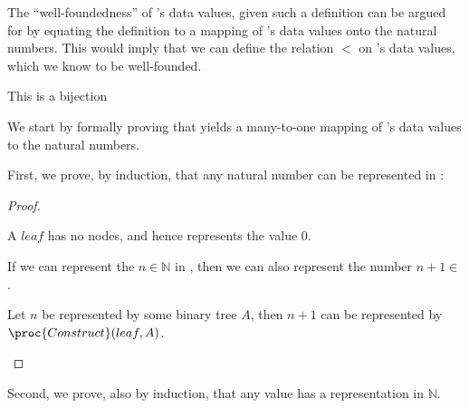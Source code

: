 The ``well-foundedness'' of 's data values, given such a definition can
be argued for by equating the definition to a mapping of 's data values
onto the natural numbers. This would imply that we can define the relation $<$
on 's data values, which we know to be well-founded. 

This is a bijection

We start by formally proving that  yields a many-to-one
mapping of 's data values to the natural numbers.

First, we prove, by induction, that any natural number can be represented in
:

\begin{proof}\ \\

\begin{description}[\setleftmargin{70pt}\setlabelstyle{\bf}]

\item [Base] A $leaf$ has no nodes, and hence represents the value $0$.

\item [Assumption] If we can represent the $n\in\mathbb{N}$ in , then
we can also represent the number $n+1\in$. 

\item [Induction] Let $n$ be represented by some binary tree $A$, then $n+1$
can be represented by $\proc{Construct}(leaf,A)$. 

\end{description}

\end{proof}

Second, we prove, also by induction, that any value  has a
representation in $\mathbb{N}$.

